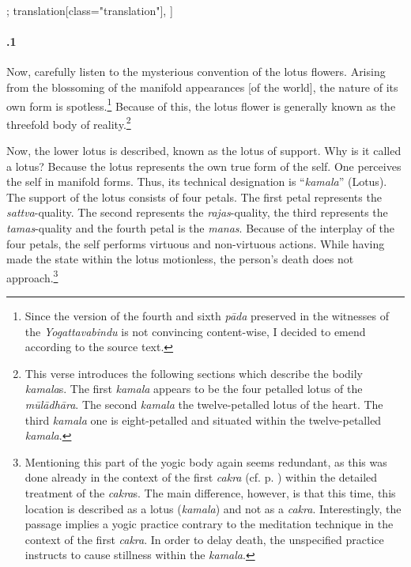 \begin{alignment}[
  texts=edition[class="edition"];
  translation[class="translation"],
  ]
\begin{translation}
\begin{tlate}[45_1]
     \paragraph{.1} Now, carefully listen to the mysterious convention of the lotus flowers. Arising from the blossoming of the manifold appearances [of the world], the nature of its own form is spotless.\footnote{Since the version of the fourth and sixth \textit{pāda} preserved in the witnesses of the \textit{Yogattavabindu} is not convincing content-wise, I decided to emend according to the source text.} Because of this, the lotus flower is generally known as the threefold body of reality.\footnote{This verse introduces the following sections which describe the bodily \textit{kamala}s. The first \textit{kamala} appears to be the four petalled lotus of the \textit{mūlādhāra}. The second \textit{kamala} the twelve-petalled lotus of the heart. The third \textit{kamala} one is eight-petalled and situated within the twelve-petalled \textit{kamala}.}
     \end{tlate}
      \begin{tlate}[p46_01]
      Now, the lower lotus is described, known as the lotus of support. Why is it called a lotus? Because the lotus represents the own true form of the self. One perceives the self in manifold forms. Thus, its technical designation is ``\textit{kamala}'' (Lotus). The support of the lotus consists of four petals. The first petal represents the \textit{sattva}-quality. The second represents the \textit{rajas}-quality, the third represents the \textit{tamas}-quality and the fourth petal is the \textit{manas}. Because of the interplay of the four petals, the self performs virtuous and non-virtuous actions. While having made the state within the lotus motionless, the person's death does not approach.\footnote{Mentioning this part of the yogic body again seems redundant, as this was done already in the context of the first \textit{cakra} (cf. p. \pageref{cakra1}) within the detailed treatment of the \textit{cakra}s. The main difference, however, is that this time, this location is described as a lotus (\textit{kamala}) and not as a \textit{cakra}. Interestingly, the passage implies a yogic practice contrary to the meditation technique in the context of the first \textit{cakra}. In order to delay death, the unspecified practice instructs to cause stillness within the \textit{kamala}.}
      \flushpage
    \end{tlate}
  \end{translation}
\end{alignment}
\pagebreak %
\cleardoublepage
{}

